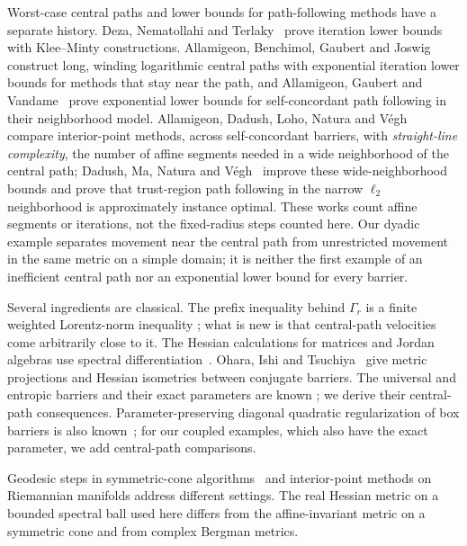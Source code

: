 Worst-case central paths and lower bounds for path-following methods
have a separate history. Deza, Nematollahi and
Terlaky~\cite{DezaNematollahiTerlaky2008} prove iteration lower bounds
with Klee--Minty constructions. Allamigeon, Benchimol, Gaubert and
Joswig~\cite{AllamigeonEtAl2018} construct long, winding logarithmic
central paths with exponential iteration lower bounds for methods that
stay near the path, and Allamigeon, Gaubert and
Vandame~\cite{AllamigeonGaubertVandame2022} prove exponential lower
bounds for self-concordant path following in their neighborhood model. Allamigeon, Dadush, Loho, Natura and
V\'egh~\cite{AllamigeonEtAl2025} compare interior-point methods, across
self-concordant barriers, with \emph{straight-line complexity}, the
number of affine segments needed in a wide neighborhood of the central
path; Dadush, Ma, Natura and V\'egh~\cite{DadushMaNaturaVegh2026}
improve these wide-neighborhood bounds and prove that trust-region path following in the narrow $\ell_2$
neighborhood is approximately instance optimal. These works count
affine segments or iterations, not the fixed-radius steps counted here.
Our dyadic example separates movement near the central path from
unrestricted movement in the same metric on a simple domain; it is
neither the first example of an inefficient central path nor an
exponential lower bound for every barrier.

Several ingredients are classical. The prefix inequality behind
$\Gamma_r$ is a finite weighted Lorentz-norm inequality
\cite{Lorentz1951}; what is new is that central-path velocities come
arbitrarily close to it. The Hessian calculations for matrices and Jordan algebras use
spectral differentiation~\cite{LewisSendov2001,Baes2007}. Ohara, Ishi
and Tsuchiya~\cite{OharaIshiTsuchiya2024} give metric projections and
Hessian isometries between conjugate barriers. The universal and
entropic barriers and their exact parameters are known
\cite{NesterovNemirovskii1994,LeeYue2021,BubeckEldan2019,Chewi2023};
we derive their central-path consequences. Parameter-preserving
diagonal quadratic regularization of box barriers is also
known~\cite{CastroCuesta2011}; for our coupled examples, which also have
the exact parameter, we add central-path comparisons.

Geodesic steps in symmetric-cone algorithms~\cite{Permenter2023} and
interior-point methods on Riemannian manifolds
\cite{HiraiNieuwboerWalter2026} address different settings. The real
Hessian metric on a bounded spectral ball used here differs from the
affine-invariant metric on a symmetric cone and from complex Bergman
metrics.

